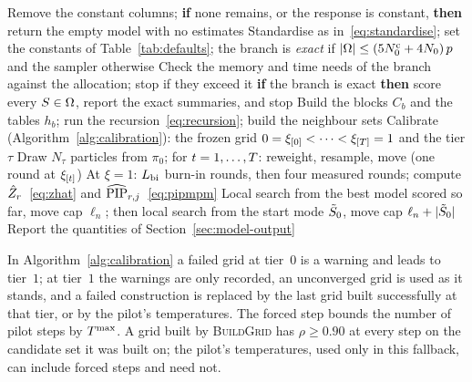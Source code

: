 \begin{algorithm}[tp]
\caption{A run of SMC-BVS. The elapsed time is checked after every step, grid construction and local search; a run
that exceeds the time allocation or meets a numerical failure stops and reports no estimates.}\label{alg:run}
\small
\begin{algorithmic}[1]
\State Remove the constant columns; \textbf{if} none remains, or the response is constant, \textbf{then} return the empty
  model with no estimates
\State Standardise as in~\eqref{eq:standardise}; set the constants of Table~\ref{tab:defaults}; the branch is
  \emph{exact} if $\lvert \Omega\rvert\le(5N^{\mathrm c}_0+4N_0)\,p$ and the sampler otherwise
\State Check the memory and time needs of the branch against the allocation; stop if they exceed it
\State \textbf{if} the branch is exact \textbf{then} score every $S\in\Omega$, report the exact summaries, and stop
\State Build the blocks $C_b$ and the tables $h_b$; run the recursion~\eqref{eq:recursion}; build the neighbour sets
\State Calibrate (Algorithm~\ref{alg:calibration}): the frozen grid $0=\xi_{[0]}<\dots<\xi_{[T]}=1$ and the tier $\tau$
  \State Draw $N_\tau$ particles from $\pi_0$; for $t=1,\dots,T$: reweight, resample, move (one round at $\xi_{[t]}$)
  \State At $\xi=1$: $L_{\mathrm{bi}}$ burn-in rounds, then four measured rounds; compute $\hat Z_r$~\eqref{eq:zhat} and
    $\widehat{\mathrm{PIP}}_{r,j}$~\eqref{eq:pipmpm}
\EndFor
\State Local search from the best model scored so far, move cap $\ell_n$; then local search from the start mode
  $\tilde S_0$, move cap $\ell_n+\lvert \tilde S_0\rvert$
\State Report the quantities of Section~\ref{sec:model-output}
\end{algorithmic}
\end{algorithm}

In Algorithm~\ref{alg:calibration} a failed grid at tier~$0$ is a warning and leads to tier~$1$; at tier~$1$ the
warnings are only recorded, an unconverged grid is used as it stands, and a failed construction is replaced by the
last grid built successfully at that tier, or by the pilot's temperatures. The forced step bounds the number of pilot
steps by $T^{\max}$. A grid built by \textsc{BuildGrid} has $\rho\ge0.90$ at every step on the candidate set it was built
on; the pilot's temperatures, used only in this fallback, can include forced steps and need not.

